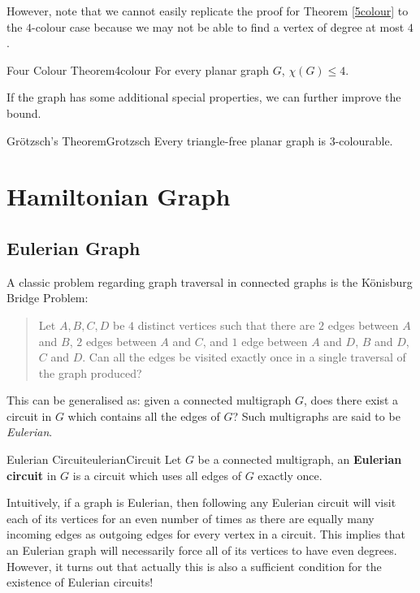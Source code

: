 \documentclass[math]{amznotes}
\theoremstyle{remark}
\newcommand{\0}{\mathbf{0}}
\newcommand{\1}{\mathbf{1}}
\begin{document}
However, note that we cannot easily replicate the proof for Theorem \ref{5colour} to the $4$-colour case because we may not be able to find a vertex of degree at most $4$. 
\begin{thmbox}{Four Colour Theorem}{4colour}
    For every planar graph $G$, $\chi(G) \leq 4$.
\end{thmbox}
If the graph has some additional special properties, we can further improve the bound.
\begin{thmbox}{Gr\"{o}tzsch's Theorem}{Grotzsch}
    Every triangle-free planar graph is $3$-colourable.
\end{thmbox}
\chapter{Hamiltonian Graph}
\section{Eulerian Graph}
A classic problem regarding graph traversal in connected graphs is the K\"{o}nisburg Bridge Problem:
\begin{quote}
    Let $A, B, C, D$ be $4$ distinct vertices such that there are $2$ edges between $A$ and $B$, $2$ edges between $A$ and $C$, and $1$ edge between $A$ and $D$, $B$ and $D$, $C$ and $D$. Can all the edges be visited exactly once in a single traversal of the graph produced?
\end{quote}
This can be generalised as: given a connected multigraph $G$, does there exist a circuit in $G$ which contains all the edges of $G$? Such multigraphs are said to be \textit{Eulerian}.
\begin{dfnbox}{Eulerian Circuit}{eulerianCircuit}
    Let $G$ be a connected multigraph, an {\color{red} \textbf{Eulerian circuit}} in $G$ is a circuit which uses all edges of $G$ exactly once.
\end{dfnbox}
Intuitively, if a graph is Eulerian, then following any Eulerian circuit will visit each of its vertices for an even number of times as there are equally many incoming edges as outgoing edges for every vertex in a circuit. This implies that an Eulerian graph will necessarily force all of its vertices to have even degrees. However, it turns out that actually this is also a sufficient condition for the existence of Eulerian circuits!
\end{document}
